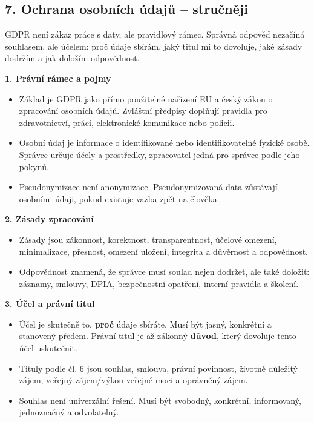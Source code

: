 
\subsection*{7. Ochrana osobních údajů -- stručněji}
GDPR není zákaz práce s daty, ale pravidlový rámec. Správná odpověď nezačíná souhlasem, ale účelem: proč údaje sbírám, jaký titul mi to dovoluje, jaké zásady dodržím a jak doložím odpovědnost.

\textbf{1. Právní rámec a pojmy}
\begin{itemize}
  \item Základ je GDPR jako přímo použitelné nařízení EU a český zákon o zpracování osobních údajů. Zvláštní předpisy doplňují pravidla pro zdravotnictví, práci, elektronické komunikace nebo policii.
  \item Osobní údaj je informace o identifikované nebo identifikovatelné fyzické osobě. Správce určuje účely a prostředky, zpracovatel jedná pro správce podle jeho pokynů.
  \item Pseudonymizace není anonymizace. Pseudonymizovaná data zůstávají osobními údaji, pokud existuje vazba zpět na člověka.
\end{itemize}

\textbf{2. Zásady zpracování}
\begin{itemize}
  \item Zásady jsou zákonnost, korektnost, transparentnost, účelové omezení, minimalizace, přesnost, omezení uložení, integrita a důvěrnost a odpovědnost.
  \item Odpovědnost znamená, že správce musí soulad nejen dodržet, ale také doložit: záznamy, smlouvy, DPIA, bezpečnostní opatření, interní pravidla a školení.
\end{itemize}

\textbf{3. Účel a právní titul}
\begin{itemize}
  \item Účel je skutečně to, \textbf{proč} údaje sbíráte. Musí být jasný, konkrétní a stanovený předem. Právní titul je až zákonný \textbf{důvod}, který dovoluje tento účel uskutečnit.
  \item Tituly podle čl. 6 jsou souhlas, smlouva, právní povinnost, životně důležitý zájem, veřejný zájem/výkon veřejné moci a oprávněný zájem.
  \item Souhlas není univerzální řešení. Musí být svobodný, konkrétní, informovaný, jednoznačný a odvolatelný.
\end{itemize}

